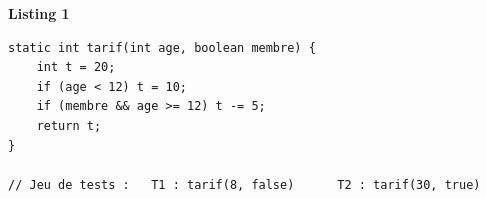 \documentclass[border=10pt]{standalone}
\begin{document}
\pagecolor{paper}\begin{minipage}{15.5cm}\vspace{4pt}
\textbf{\small\color{gray}Listing 1}\par\vspace{2pt}
\lstset{style=sv}
\begin{lstlisting}
static int tarif(int age, boolean membre) {
    int t = 20;
    if (age < 12) t = 10;
    if (membre && age >= 12) t -= 5;
    return t;
}

// Jeu de tests :   T1 : tarif(8, false)      T2 : tarif(30, true)
\end{lstlisting}
\vspace{2pt}\end{minipage}
\end{document}
